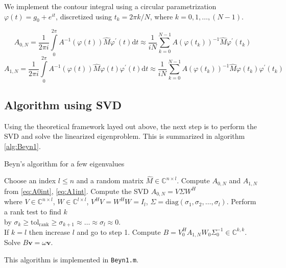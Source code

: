 \documentclass[11pt,letterpaper]{article}
\newcommand{\diff}{\mathrm{d}}
\begin{document}
We implement the contour integral using a circular parametrization $\varphi(t) = g_0 + e^{i t}$, discretized using $t_k = 2\pi k/N$, where $k=0,1,\ldots,(N-1)$. 

\begin{equation}\label{eq:A0int}
A_{0,N} = \frac{1}{2\pi i}\int\limits_{0}^{2\pi} A^{-1}(\varphi(t))\hat{M} \varphi^{\prime}(t)\diff t 
\approx \frac{1}{iN}\sum\limits_{k=0}^{N-1}A(\varphi(t_k))^{-1}\hat{M}\varphi^{\prime}(t_k)
\end{equation}
\begin{equation}\label{eq:A1int}
A_{1,N} = \frac{1}{2\pi i}\int\limits_{0}^{2\pi} A^{-1}(\varphi(t))\hat{M} \varphi(t) \varphi^{\prime}(t)\diff t
\approx \frac{1}{iN}\sum\limits_{k=0}^{N-1}A(\varphi(t_k))^{-1}\hat{M} \varphi(t_k) \varphi^{\prime}(t_k)
\end{equation}

\subsection{Algorithm using SVD}
Using the theoretical framework layed out above, the next step is to perform the SVD and solve the linearized eigenproblem. This is summarized in algorithm \ref{alg:Beyn1}. 

\begin{algorithm}
\caption{Beyn's algorithm for a few eigenvalues}
\label{alg:Beyn1}
\begin{algorithmic}
\REQUIRE Choose an index $l\leq n$ and a random matrix $\hat{M}\in\mathbb{C}^{n\times l}$. 
\STATE Compute $A_{0,N}$ and $A_{1,N}$ from \ref{eq:A0int}, \ref{eq:A1int}. 
\STATE Compute the SVD $A_{0,N} = V\Sigma W^{H}$ 
\\ \hspace{0.5cm} where $V\in\mathbb{C}^{n\times l}$, $W\in\mathbb{C}^{l\times l}$, $V^{H}V=W^{H}W = I_{l}$, $\Sigma = \mathrm{diag}(\sigma_1,\sigma_2,\ldots,\sigma_l)$.
\STATE Perform a rank test to find $k$ 
\\ \hspace{0.5cm} by $\sigma_k \geq \mathrm{tol_{rank}}\geq \sigma_{k+1} \approx \ldots \approx \sigma_l \approx 0$. 
\\ \hspace{0.5cm} If $k = l$ then increase $l$ and go to step 1. 
\STATE Compute $B = V_0^H A_{1,N} W_0 \Sigma_0^{-1} \in \mathbb{C}^{k,k}$.
\STATE Solve $B\mathbf{v} =\omega\mathbf{v}$.
\end{algorithmic}
\end{algorithm}
This algorithm is implemented in {\tt Beyn1.m}. 
\end{document}
